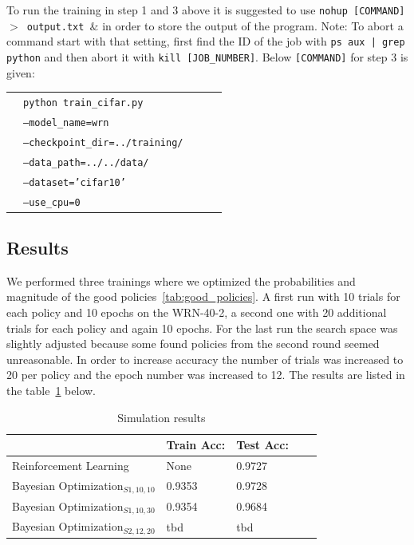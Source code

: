 \documentclass[10pt,twocolumn,letterpaper]{article}
\begin{document}
To run the training in step 1 and 3 above it is suggested to use \texttt{nohup [COMMAND] $>$ output.txt $\&$} in order to store the output of the program. Note: To abort a command start with that setting, first find the ID of the job with \texttt{ps aux | grep python} and then abort it with \texttt{kill [JOB\_NUMBER]}. Below \texttt{[COMMAND]} for step 3 is given:

\begin{table}[h!]
\begin{center}
\begin{tabular}{lllll}
 &\texttt{python train\_cifar.py}  \\
 &\qquad \qquad \texttt{--model\_name=wrn}  \\
 &\qquad \qquad \texttt{--checkpoint\_dir=../training/}   \\
 &\qquad \qquad \texttt{--data\_path=../../data/}  \\
 &\qquad \qquad \texttt{--dataset='cifar10'} \\
 &\qquad \qquad \texttt{--use\_cpu=0}
\end{tabular}
\end{center}
\end{table}

\subsection{Results}
We performed three trainings where we optimized the probabilities and magnitude of the good policies~\ref{tab:good_policies}. A first run with 10 trials for each policy and 10 epochs on the WRN-40-2, a second one with 20 additional trials for each policy and again 10 epochs. For the last run the search space was slightly adjusted because some found policies from the second round seemed unreasonable. In order to increase accuracy the number of trials was increased to 20 per policy and the epoch number was increased to 12. The results are listed in the table~\ref{tab:results} below.
\begin{table}[h!]
\begin{center}
\begin{tabular}{lllll}
\hline
& Train Acc: &Test Acc: \\
\hline
Reinforcement Learning & None & 0.9727 \\
Bayesian Optimization$_{S1,10,10}$ & 0.9353 & 0.9728 \\
Bayesian Optimization$_{S1,10,30}$ & 0.9354 & 0.9684 \\
Bayesian Optimization$_{S2,12,20}$ & tbd & tbd \\
\hline
\end{tabular}
\caption {Simulation results} \label{tab:results} 
\end{center}
\end{table}
\end{document}
